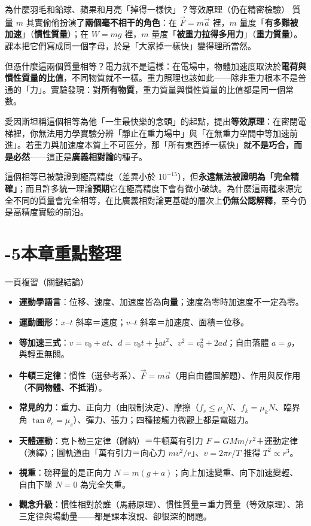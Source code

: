 \documentclass[11pt]{article}
\begin{document}

\begin{延伸框}{為什麼羽毛和鉛球、蘋果和月亮「掉得一樣快」？等效原理（仍在精密檢驗）}
質量 $m$ 其實偷偷扮演了\textbf{兩個毫不相干的角色}：在 $\vec{F}=m\vec{a}$ 裡，$m$ 量度「\textbf{有多難被加速}」（\textbf{慣性質量}）；在 $W=mg$ 裡，$m$ 量度「\textbf{被重力拉得多用力}」（\textbf{重力質量}）。課本把它們寫成同一個字母，於是「大家掉一樣快」變得理所當然。

但憑什麼這兩個質量相等？電力就不是這樣：在電場中，物體加速度取決於\textbf{電荷與慣性質量的比值}，不同物質就不一樣。重力照理也該如此——除非重力根本不是普通的「力」。實驗發現：對\textbf{所有物質}，重力質量與慣性質量的比值都是同一個常數。

愛因斯坦稱這個相等為他「一生最快樂的念頭」的起點，提出\textbf{等效原理}：在密閉電梯裡，你無法用力學實驗分辨「靜止在重力場中」與「在無重力空間中等加速前進」。若重力與加速度本質上不可區分，那「所有東西掉一樣快」就\textbf{不是巧合，而是必然}——這正是\textbf{廣義相對論}的種子。

這個相等已被驗證到極高精度（差異小於 $10^{-15}$），但\textbf{永遠無法被證明為「完全精確」}；而且許多統一理論\textbf{預期}它在極高精度下會有微小破缺。為什麼這兩種來源完全不同的質量會完全相等，在比廣義相對論更基礎的層次上\textbf{仍無公認解釋}，至今仍是高精度實驗的前沿。
\end{延伸框}

\section*{-5\quad 本章重點整理}

\begin{補充框}{一頁複習（關鍵結論）}
\begin{itemize}\setlength{\itemsep}{2pt}
\item \textbf{運動學語言}：位移、速度、加速度皆為\textbf{向量}；速度為零時加速度不一定為零。
\item \textbf{運動圖形}：$x$–$t$ 斜率＝速度；$v$–$t$ 斜率＝加速度、面積＝位移。
\item \textbf{等加速三式}：$v=v_0+at$、$d=v_0t+\tfrac12at^2$、$v^2=v_0^2+2ad$；自由落體 $a=g$，與輕重無關。
\item \textbf{牛頓三定律}：慣性（選參考系）、$\vec{F}=m\vec{a}$（用自由體圖解題）、作用與反作用（\textbf{不同物體、不抵消}）。
\item \textbf{常見的力}：重力、正向力（由限制決定）、摩擦（$f_s\le\mu_s N$、$f_k=\mu_k N$、臨界角 $\tan\theta_c=\mu_s$）、彈力、張力；四種接觸力微觀上都是電磁力。
\item \textbf{天體運動}：克卜勒三定律（歸納）＝牛頓萬有引力 $F=GMm/r^2$＋運動定律（演繹）；圓軌道由「萬有引力＝向心力 $mv^2/r$」、$v=2\pi r/T$ 推得 $T^2\propto r^3$。
\item \textbf{視重}：磅秤量的是正向力 $N=m(g+a)$；向上加速變重、向下加速變輕、自由下墜 $N=0$ 為完全失重。
\item \textbf{觀念升級}：慣性相對於誰（馬赫原理）、慣性質量＝重力質量（等效原理）、第三定律與場動量——都是課本沒說、卻很深的問題。
\end{itemize}
\end{補充框}
\end{document}
